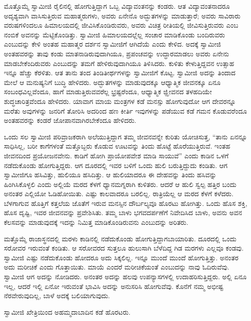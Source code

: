  ಮೊತ್ತೊಮ್ಮೆ ಸ್ವಾಮೀಜಿ ರೈಲಿನಲ್ಲಿ ಹೋಗುತ್ತಿದ್ದಾಗ ಒಬ್ಬ ವಿದ್ಯಾವಂತನನ್ನು ಕಂಡರು. ಆತ ವಿದ್ಯಾವಂತನಾದರೂ ಅದೃಶ್ಯವಾಗಿ ವಾಸಿಸುತ್ತಿರುವ ಮಹಾತ್ಮರುಗಳು, ಅವರು ಏನೇನೊ ಅದ್ಭುತಗಳನ್ನು ಮಾಡುತ್ತಾರೆ; ಅವರು ಸಾವಿರಾರು ವರುಷಗಳಿಂದಲೂ ಹಿಮಾಲಯದಲ್ಲಿ ಜೀವಿಸಿಕೊಂಡಿರುವರು, ಅವರು ವಿಚಿತ್ರ ರೀತಿಯಲ್ಲಿ ಜೀವಿಸುತ್ತಿರುವರು ಎಂಬ ನಂಬಿಕೆ ಅವನನ್ನು ಮೆಟ್ಟಿಕೊಂಡಿತ್ತು. ಸ್ವಾಮೀಜಿ ಹಿಮಾಲಯದಲ್ಲೆಲ್ಲ ಸಂಚಾರ ಮಾಡಿಕೊಂಡು ಬಂದಿರುವರು ಎಂಬುದನ್ನು ಕೇಳಿ ಅಂತಹ ಮಹಾತ್ಮರ ದರ್ಶನ ಸ್ವಾಮೀಜಿಗೆ ಆಗಿದೆಯೆ ಎಂದು ಕೇಳಿದ. ಅದಕ್ಕೆ ಸ್ವಾಮೀಜಿ ಅಂತಹವರನ್ನು ತಾವು ಕಂಡು ಮಾತನಾಡಿರುವುದಾಗಿಯೂ, ಪ್ರಪಂಚವನ್ನು ಉದ್ಧಾರಮಾಡಲು ಅವರು ಏನೇನು ಮಾಡಬೇಕೆಂದಿರುವರು ಎಂಬುದನ್ನು ತಮಗೆ ಹೇಳಿರುವುದಾಗಿಯೂ ತಿಳಿಸಿದರು. ಕುಳಿತು ಕೇಳುತ್ತಿದ್ದವನ ಉತ್ಸಾಹ ಇನ್ನೂ ಹೆಚ್ಚು ಕೆರಳಿತು. ಆತ ತಾನು ತಂದ ತಿಂಡಿತೀರ್ಥಗಳನ್ನು ಸ್ವಾಮೀಜಿಗೆ ಕೊಟ್ಟ. ಸ್ವಾಮೀಜಿ ಅದನ್ನು ತಿಂದಾದ ಮೇಲೆ ಆ ಮನುಷ್ಯನಿಗೆ ಬುದ್ಧಿ ಹೇಳಿದರು. ಅದ್ಭುತಗಳನ್ನು ಮಾಡುವುದಕ್ಕೂ ಆಧ್ಯಾತ್ಮಿಕ ಜೀವನಕ್ಕೂ ಏನೂ ಸಂಬಂಧವಿಲ್ಲವೆಂದೂ, ಹಾಗೆ ಮಾಡುತ್ತಿರುವವರೆಲ್ಲ ಭ್ರಷ್ಟರೆಂದೂ, ಆಧ್ಯಾತ್ಮಿಕ ಜ್ಝೀವನದ ತಳಹದಿಯೇ ಶುದ್ಧಚಾರಿತ್ರವೆಂದೂ ಹೇಳಿದರು. ಯಾವಾಗ ಮಾಯ ಮಂತ್ರಗಳ ಕಡೆ ಮನಸ್ಸು ಹೋಗುವುದೋ ಆಗ ದೇವರನ್ನೂ ಮರೆತು ಅವುಗಳನ್ನು ಜನರಿಗೆ ತೋರಿಸಿ ಅದರಿಂದ ಹಣ ಕೀರ್ತಿ ಇವುಗಳನ್ನು ಪಡೆಯುವ ಕಡೆ ಗಮನ ಕೊಡುವರೆಂದೂ ಅಂತಹವರನ್ನು ಕಂಡರೆ ಜೋಪಾನವಾಗಿರಬೇಕೆಂದೂ ಹೇಳಿದರು. 

 ಒಂದು ಸಲ ಸ್ವಾಮೀಜಿ ಪರಿವ್ರಾಜಕರಾಗಿ ಅಲೆಯುತ್ತಿದ್ದಾಗ ತಮ್ಮ ಜೀವನವನ್ನೇ ಕುರಿತು ಯೋಚಿಸುತ್ತ, “ತಾನು ಏನನ್ನೂ ಸಾಧಿಸಿಲ್ಲ, ಬರೀ ಕಾಗೆಗಳಂತೆ ಮತ್ತೊಬ್ಬರು ಕೊಡುವ ಊಟವನ್ನು ತಿಂದು ಹೊಟ್ಟೆ ಹೊರೆಯುತ್ತಿರುವೆ. ಇಂತಹ ಜೀವನದಿಂದ ಪ್ರಯೋಜನವೇನು. ಕಾಡಿಗೆ ಹೋಗಿ ಪ್ರಾಯೋಪವೇಶ ಮಾಡಿ ಸಾಯುವೆ” ಎಂದು ಕಾಡಿನ ಒಳಗೆ ನಡೆದುಕೊಂಡು ಹೋಗುತ್ತಿದ್ದರು. ಆಗ ದೂರದಲ್ಲಿ ಇವರ ಬಳಿಗೆ ಒಂದು ಹುಲಿ ಬರುತ್ತಿದ್ದುದು ಕಂಡಿತು. ಆಗ ಸ್ವಾಮೀಜಿಗೂ ಹಸಿವಿತ್ತು, ಹುಲಿಯೂ ಹಸಿದಿತ್ತು. ಆ ಹುಲಿಯಾದರೂ ಈ ದೇಹವನ್ನು ತಿಂದು ಹಸಿವನ್ನು ಹಿಂಗಿಸಿಕೊಳ್ಳಲಿ ಎಂದು ಅಲ್ಲಿಯೆ ಮರದ ಕೆಳಗೆ ಧ್ಯಾನಮಗ್ನರಾಗಿ ಕುಳಿತರು. ಆದರೆ ಆ ಹುಲಿ ಸ್ವಲ್ಪ ಹತ್ತಿರ ಬಂದು ಅನಂತರ ಎಲ್ಲಿಯೋ ಓಡಿಹೋಯಿತು. ಎಷ್ಟು ಕಾಲವಾದರೂ ಬರಲಿಲ್ಲ. ರಾತ್ರಿಯೆಲ್ಲ ಆ ಮರದ ಕೆಳಗೆ ಕಳೆದರು. ಬೆಳಗಾಗುವ ಹೊತ್ತಿಗೆ ಕತ್ತಲೆಯ ಜೊತೆಗೆ ಇರುವ ಮನಸ್ಸಿನ ದೌರ್ಬಲ್ಯವೂ ಹೊರಟು ಹೋಗಿತ್ತು. ಒಂದು ಹೊಸ ಶಕ್ತಿ, ಹೊಸ ದೃಷ್ಟಿ, ಇವರ ಜೀವನವನ್ನು ಪ್ರವೇಶಿಸಿತು. ತಮ್ಮ ಬಾಳು ಭಗವದರ್ಪಣೆಗೆ ನಿವೇದಿಸಿದ ಬಾಳು, ಅವನು ಅವನ ಕೆಲಸವನ್ನು ಮಾಡುವುದಕ್ಕೆ ಇದನ್ನು ನಿಮಿತ್ತ ಮಾಡಿಕೊಂಡಿರುವನು ಎಂಬುದನ್ನು ಅರಿತರು. 

 ಮತ್ತೊಮ್ಮೆ ರಾಜಾಸ್ಥನದಲ್ಲಿ ಮರಳು ಕಾಡಿನಲ್ಲಿ ನಡೆದುಕೊಂಡು ಹೋಗುತ್ತಿದ್ದಾಗ\break ಬಾಯಾರಿತು. ದೂರದಲ್ಲಿ ಒಂದು ಸರೋವರ ಇರುವಂತೆ ಕಂಡಿತು. ಆ ಸರೋವರದ ಸುತ್ತಲೂ ಹುಲುಸಾಗಿ ಬೆಳೆದಿದ್ದ ಗಿಡ ಮರಗಳು ಎಲ್ಲವೂ ಕಂಡವು. ಸ್ವಾಮೀಜಿ ಎಷ್ಟು ನಡೆದುಕೊಂಡು ಹೋದರೂ ಅದು ಸಿಕ್ಕಲಿಲ್ಲ. ಇನ್ನೂ ಮುಂದೆ ಮುಂದೆ ಹೋಗುತ್ತಿತ್ತು. ಅನಂತರ ಅದು ಮರೀಚಿಕೆ ಎಂದು ಗೊತ್ತಾಯಿತು. ಮಾಯೆ ಎಂದರೆ ಮರೀಚಿಕೆಯಂತೆ ಎಂಬುದನ್ನು ನಾವು ಓದಿರುವೆವು. ಸ್ವಾಮೀಜಿ ಆಗ ಅದನ್ನು ನೋಡಿದರು. ಅನಂತರ ಅದನ್ನು ಹಲವು ಉಪನ್ಯಾಸಗಳಲ್ಲಿ ಉದಾಹರಿಸುತ್ತಿದ್ದರು. ಅಲ್ಲಿ ಏನೂ ಇಲ್ಲ, ಆದರೆ ಇಲ್ಲಿ ಏನೋ ಇರುವಂತೆ ಭಾವಿಸಿ ಅದನ್ನು ಅನುಸರಿಸಿ ಹೋಗುವೆವು. ಕೊನೆಗೆ ನಮ್ಮ ಅಭೀಷ್ಟ ನೆರವೇರುವುದಿಲ್ಲ, ಬಾಳೆ ಅದಕ್ಕೆ ಬಲಿಯಾಗುವುದು. 

 ಸ್ವಾಮೀಜಿ ಖೇತ್ರಿಯಿಂದ ಅಹಮ್ಮದಾಬಾದಿನ ಕಡೆ ಹೊರಟರು. 

